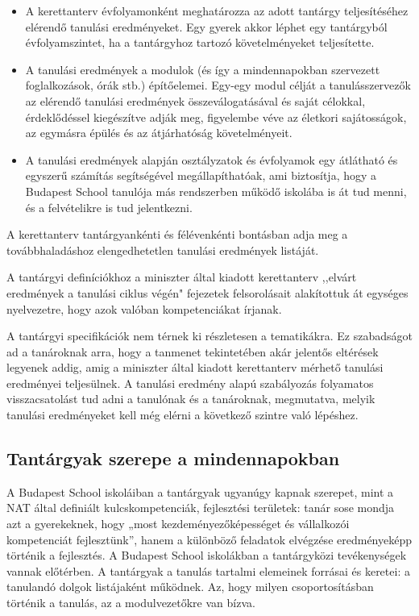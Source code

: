 \begin{itemize}

      \item A kerettanterv évfolyamonként meghatározza az adott tantárgy teljesítéséhez elérendő tanulási eredményeket. Egy gyerek akkor  léphet egy tantárgyból évfolyamszintet, ha a tantárgyhoz tartozó követelményeket teljesítette.

      \item A tanulási eredmények a modulok (és így a mindennapokban szervezett foglalkozások, órák stb.) építőelemei. Egy-egy modul célját a  tanulásszervezők az elérendő tanulási eredmények	összeválogatásával és saját célokkal, érdeklődéssel kiegészítve adják meg, figyelembe véve az életkori  sajátosságok, az egymásra épülés és az átjárhatóság  követelményeit.
      \item A tanulási eredmények alapján osztályzatok és évfolyamok egy átlátható és egyszerű számítás segítségével megállapíthatóak, ami biztosítja, hogy a Budapest  School tanulója más rendszerben működő iskolába is át tud menni, és a felvételikre is tud jelentkezni.
\end{itemize}

A kerettanterv tantárgyankénti és félévenkénti bontásban adja meg a továbbhaladáshoz elengedhetetlen tanulási eredmények listáját.

A tantárgyi definíciókhoz a miniszter által kiadott kerettanterv ,,elvárt eredmények a tanulási ciklus végén" fejezetek felsorolásait alakítottuk át egységes nyelvezetre, hogy azok valóban kompetenciákat írjanak.

A tantárgyi specifikációk nem térnek ki rész\-letesen a tematikákra. Ez szabadságot ad a tanároknak arra, hogy a tanmenet tekintetében akár jelentős eltérések legyenek addig, amig a miniszter által kiadott kerettanterv mérhető tanulási eredményei teljesülnek. A tanulási eredmény alapú szabályozás folyamatos visszacsatolást tud adni a tanulónak és a tanároknak, megmutatva, melyik tanulási eredményeket kell még elérni a következő szintre való lépéshez.

\subsection{Tantárgyak szerepe a mindennapokban}
A Budapest School iskoláiban a tantárgyak ugyanúgy kapnak szerepet, mint a NAT által definiált kulcskompetenciák, fejlesztési területek: tanár sose mondja azt a gyerekeknek, hogy „most kezdeményezőképességet és vállalkozói kompetenciát fejlesztünk'', hanem a különböző feladatok elvégzése eredményeképp történik a fejlesztés. A Budapest School iskolákban a tantárgyközi tevékenységek vannak előtérben. A tantárgyak a tanulás tartalmi elemeinek forrásai és keretei: a tanulandó dolgok listájaként működnek. Az, hogy milyen csoportosításban történik a tanulás, az a modulvezetőkre van bízva.

